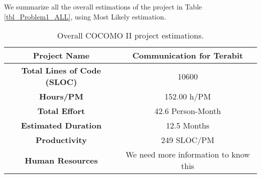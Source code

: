 We summarize all the overall estimations of the project in Table \ref{tbl_Problem1_ALL}, using Most Likely estimation.

\begin{table}[hbtp]
\centering
\begin{tabular}{|c|c|} \hline
\textbf{Project Name} & {Communication for Terabit} \\ \hline
\textbf{Total Lines of Code (SLOC)} & {10600} \\ \hline
\textbf{Hours/PM} & {152.00 h/PM} \\ \hline
\textbf{Total Effort} & {42.6 Person-Month} \\ \hline
\textbf{Estimated Duration} & {12.5 Months} \\ \hline
\textbf{Productivity} & {249 SLOC/PM} \\ \hline
\textbf{Human Resources} & We need more information to know this \\ \hline
\end{tabular}
\label{tbl_Problem2_ALL}
\caption{Overall COCOMO II project estimations.}
\end{table}
